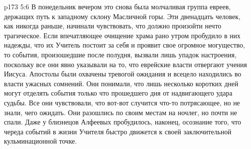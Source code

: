 \vs p173 5:6 В понедельник вечером это снова была молчаливая группа евреев, держащих путь к западному склону Масличной горы. Эти двенадцать человек, как никогда раньше, начинали чувствовать, что должно произойти нечто трагическое. Если впечатляющее очищение храма рано утром пробудило в них надежды, что их Учитель постоит за себя и проявит свое огромное могущество, то события, произошедшие после полудня, вызвали лишь упадок настроения, поскольку все они явно указывали на то, что еврейские власти отвергают учения Иисуса. Апостолы были охвачены тревогой ожидания и всецело находились во власти ужасных сомнений. Они понимали, что лишь несколько коротких дней могут отделять события только что прошедшего дня от надвигающего удара судьбы. Все они чувствовали, что вот\hyp{}вот случится что\hyp{}то потрясающее, но не знали, чего ожидать. Они разошлись по своим местам на ночлег, но почти не спали. Даже у близнецов Алфеевых пробудилось, наконец, осознание того, что череда событий в жизни Учителя быстро движется к своей заключительной кульминационной точке.
